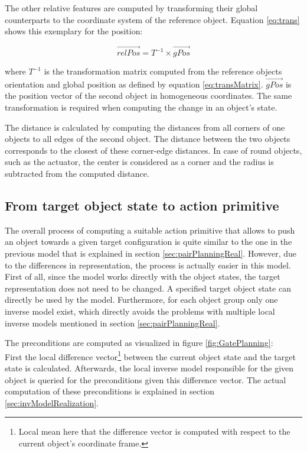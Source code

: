 The other relative features are computed by transforming their global counterparts to the coordinate system of the reference object. Equation \ref{eq:trans} shows this exemplary for the position:

\begin{equation}
	\vec{relPos} = T^{-1} \times \vec{gPos}
\label{eq:trans}
\end{equation}

where $T^{-1}$ is the transformation matrix computed from the reference objects orientation and global position as defined by equation \ref{eq:transMatrix}. $\vec{gPos}$ is the position vector of the second object in homogeneous coordinates. The same transformation is required when computing the change in an object's state. 

The distance is calculated by computing the distances from all corners of one objects to all edges of the second object. 
The distance between the two objects corresponds to the closest of these corner-edge distances. In case of round objects, such as the actuator, the center is considered as a corner and the radius is subtracted from the computed distance.


\subsection{From target object state to action primitive \label{sec:gatePlanningReal}}

The overall process of computing a suitable action primitive that allows to push an object towards a given target configuration is quite similar to the one in the previous model that is explained in section \ref{sec:pairPlanningReal}. However, due to the differences in representation, the process is actually easier in this model. 
First of all, since the model works directly with the object states, the target representation does not need to be changed. A specified target object state can directly be used by the model. 
Furthermore, for each object group only one inverse model exist, which directly avoids the problems with multiple local inverse models mentioned in section \ref{sec:pairPlanningReal}. 

The preconditions are computed as visualized in figure \ref{fig:GatePlanning}: \\
First the local difference vector\footnote{Local mean here that the difference vector is computed with respect to the current object's coordinate frame.} between the current object state and the target state is calculated.
Afterwards, the local inverse model responsible for the given object is queried for the preconditions given this difference vector. The actual computation of these preconditions is explained in section \ref{sec:invModelRealization}.

